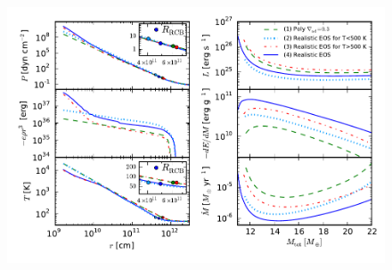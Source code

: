 \documentclass[apj]{emulateapj}
\begin{document}
\begin{figure}[tb]
\centering
\includegraphics[width=\textwidth]{../../figs/ModelAtmospheres/RadSelfGravRealEOS/PaperFigs/all_plot_test.pdf}
\caption{
}
\end{figure}
\end{document}
